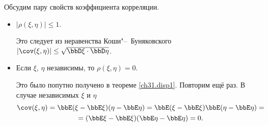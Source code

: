 Обсудим пару свойств коэффициента корреляции.
\begin{itemize}
\item 
$|\rho(\xi,\eta)|\le1$.

Это следует из неравенства Коши"--~Буняковского $|\cov(\xi,\eta)| \le \sqrt{\bbD\xi\cdot \bbD\eta}$.
\item
Если $\xi$, $\eta$ независимы, то $\rho(\xi,\eta)=0$.

Это было попутно получено в теореме \ref{ch31.disp1}. Повторим ещё раз. В случае независимых $\xi$ и $\eta$
\begin{multline*}
\cov(\xi,\eta)=\bbE(\xi - \bbE\xi)(\eta - \bbE\eta) = \bbE(\xi - \bbE\xi)\bbE(\eta - \bbE\eta)=\\ = (\bbE\xi - \bbE\xi)(\bbE\eta - \bbE\eta) = 0.
\end{multline*}
\end{itemize}

